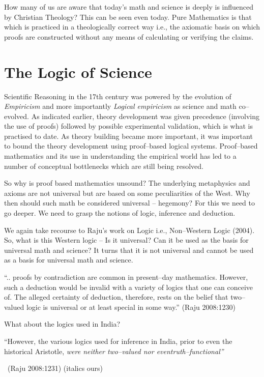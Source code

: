 How many of us are aware that today’s math and science is deeply is influenced by Christian Theology? This can be seen even today. Pure Mathematics is that which is practiced in a theologically correct way i.e., the axiomatic basis on which proofs are constructed without any means of calculating or verifying the claims.


\section*{The Logic of Science}

Scientific Reasoning in the 17th century was powered by the evolution of \textit{Empiricism} and more importantly \textit{Logical empiricism} as science and math co–evolved. As indicated earlier, theory development was given precedence (involving the use of proofs) followed by possible experimental validation, which is what is practised to date. As theory building became more important, it was important to bound the theory development using proof–based logical systems. Proof–based mathematics and its use in understanding the empirical world has led to a number of conceptual bottlenecks which are still being resolved.

So why is proof based mathematics unsound? The underlying metaphysics and axioms are not universal but are based on some peculiarities of the West. Why then should such math be considered universal – hegemony? For this we need to go deeper. We need to grasp the notions of logic, inference and deduction.

We again take recourse to Raju’s work on Logic i.e., Non–Western Logic (2004). So, what is this Western logic – Is it universal? Can it be used as the basis for universal math and science? It turns that it is not universal and cannot be used as a basis for universal math and science.

\begin{myquote}
“.. proofs by contradiction are common in present–day mathematics. However, such a deduction would be invalid with a variety of logics that one can conceive of. The alleged certainty of deduction, therefore, rests on the belief that two–valued logic is universal or at least special in some way.” \hfill (Raju 2008:1230)
\end{myquote}

What about the logics used in India?

\begin{myquote}
“However, the various logics used for inference in India, prior to even the historical Aristotle, \textit{were neither two–valued nor even\break truth–functional”} 

~\hfill (Raju 2008:1231) (italics ours)
\end{myquote}

